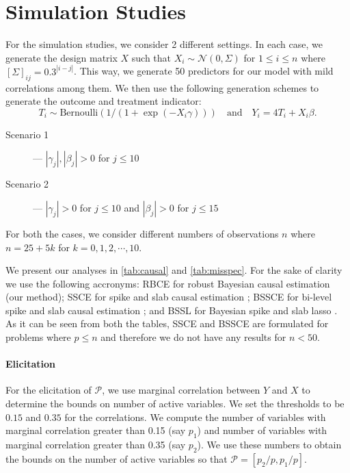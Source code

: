 \documentclass{amsart}
\begin{document}
\section{Simulation Studies}\label{sec:sim}

For the simulation studies, we consider 2 different settings. In each
case, we generate the design matrix $X$ such that $X_i\sim\mathcal{N}(0, \Sigma)$
for $1\le i\le n$ where $[\Sigma]_{ij} = 0.3^{|i-j|}$. This way, we 
generate 50 predictors for our model with mild correlations among them.
We then use the following generation schemes to generate the outcome and
treatment indicator: 
\begin{equation}
    T_i \sim \text{Bernoulli}\left(1/(1+\exp(-X_i\gamma))\right)
    \quad\text{and}\quad
    Y_i = 4T_i + X_i\beta.
\end{equation}
\begin{description}
    \item[Scenario 1] --- $|\gamma_j|, |\beta_j|>0$ for $j\le 10$
    \item[Scenario 2] --- $|\gamma_j|>0$ for $j\le 10$ and $|\beta_j|>0$ for $j\le 15$
\end{description}
For both
the cases, we consider different numbers of observations $n$ where
$n=25+ 5k$ for $k=0,1,2,\cdots,10$. %

We present our analyses in \cref{tab:causal} and \cref{tab:misspec}.
For the sake of clarity we use the following accronyms: RBCE for 
robust Bayesian causal estimation (our method); SSCE for spike and
slab causal estimation \cite{koch2020}; BSSCE for bi-level spike and slab causal
estimation \cite{koch2020}; and BSSL for Bayesian spike and slab lasso
\cite{xu2015}. As it can be
seen from both the tables, SSCE and BSSCE are formulated for problems
where $p\le n$ and therefore we do not have any results for $n<50$.

\paragraph{Elicitation} For the
elicitation of $\mathcal{P}$, we use marginal correlation between 
$Y$ and $X$ to determine the bounds on number of active variables. We 
set the thresholds to be $0.15$ and $0.35$ for the correlations. We compute the
number of variables with marginal correlation greater than 0.15
(say $p_1$) and number of variables with  marginal 
correlation greater than 0.35 (say $p_2$). 
We use these numbers to obtain the bounds on the number of active
variables so that $\mathcal{P}=[p_2/p , p_1/p]$.
\end{document}
